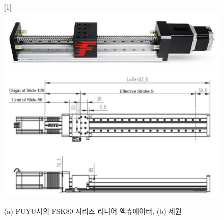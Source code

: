 \begin{figure}[H]
    \begin{center}
        \scalebox{-1}[1]{\includegraphics[width = 12cm]{images/Linear_Actuator.jpg}}
        \includegraphics[width = 12cm]{images/Linear_Actuator(Design).jpg}
    \end{center}
        \caption{(a) FUYU사의 FSK80 시리즈 리니어 액츄에이터, (b) 제원}
        \label{linear actuator}
\end{figure}



